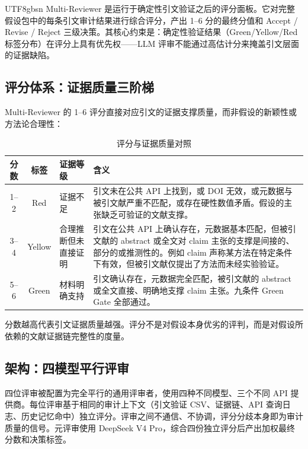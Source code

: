 \documentclass[11pt,a4paper]{article}
\begin{document}
\begin{CJK*}{UTF8}{gbsn}
Multi-Reviewer 是运行于确定性引文验证之后的评分面板。它对完整假设包中的每条引文审计结果进行综合评分，产出 1--6 分的最终分值和 Accept / Revise / Reject 三级决策。其核心约束是：确定性验证结果（Green/Yellow/Red 标签分布）在评分上具有优先权——LLM 评审不能通过高估计分来掩盖引文层面的证据缺陷。

\subsection{评分体系：证据质量三阶梯}

Multi-Reviewer 的 1--6 评分直接对应引文的证据支撑质量，而非假设的新颖性或方法论合理性：

\begin{table}[htbp]
\centering
\caption{评分与证据质量对照}
\begin{tabularx}{\textwidth}{@{}ccl>{\raggedright\arraybackslash}X@{}}
\toprule
\textbf{分数} & \textbf{标签} & \textbf{证据等级} & \textbf{含义} \\
\midrule
1--2 & Red   & 证据不足   & 引文未在公共 API 上找到，或 DOI 无效，或元数据与被引文献严重不匹配，或存在硬性数值矛盾。假设的主张缺乏可验证的文献支撑。 \\
3--4 & Yellow & 合理推断但未直接证明 & 引文在公共 API 上确认存在，元数据基本匹配，但被引文献的 abstract 或全文对 claim 主张的支撑是间接的、部分的或推测性的。例如 claim 声称某方法在特定条件下有效，但被引文献仅提出了方法而未经实验验证。 \\
5--6 & Green  & 材料明确支持 & 引文确认存在，元数据完全匹配，被引文献的 abstract 或全文直接、明确地支撑 claim 主张。九条件 Green Gate 全部通过。 \\
\bottomrule
\end{tabularx}
\end{table}

分数越高代表引文证据质量越强。评分不是对假设本身优劣的评判，而是对假设所依赖的文献证据链完整性的度量。

\subsection{架构：四模型平行评审}

四位评审被配置为完全平行的通用评审者，使用四种不同模型、三个不同 API 提供商。每位评审基于相同的审计上下文（引文验证 CSV、证据链、API 查询日志、历史记忆命中）独立评分。评审之间不通信、不协调，评分分歧本身即为审计质量的信号。元评审使用 DeepSeek V4 Pro，综合四份独立评分后产出加权最终分数和决策标签。


\end{CJK*}
\end{document}
